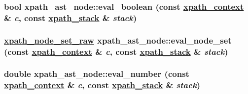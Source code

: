 \hypertarget{classxpath__ast__node_b7f965a92023bc2704b8e6fd9f3d7c14}{
\subsubsection[eval\_\-boolean]{\setlength{\rightskip}{0pt plus 5cm}bool xpath\_\-ast\_\-node::eval\_\-boolean (const \hyperlink{structxpath__context}{xpath\_\-context} \& {\em c}, const \hyperlink{structxpath__stack}{xpath\_\-stack} \& {\em stack})}}
\label{classxpath__ast__node_b7f965a92023bc2704b8e6fd9f3d7c14}


\hypertarget{classxpath__ast__node_30d98ec97e3129e82ac9ec3f2a759855}{
\subsubsection[eval\_\-node\_\-set]{\setlength{\rightskip}{0pt plus 5cm}\hyperlink{classxpath__node__set__raw}{xpath\_\-node\_\-set\_\-raw} xpath\_\-ast\_\-node::eval\_\-node\_\-set (const \hyperlink{structxpath__context}{xpath\_\-context} \& {\em c}, const \hyperlink{structxpath__stack}{xpath\_\-stack} \& {\em stack})}}
\label{classxpath__ast__node_30d98ec97e3129e82ac9ec3f2a759855}


\hypertarget{classxpath__ast__node_92dd7048e28d486bc7f382d1fc6f1de6}{
\subsubsection[eval\_\-number]{\setlength{\rightskip}{0pt plus 5cm}double xpath\_\-ast\_\-node::eval\_\-number (const \hyperlink{structxpath__context}{xpath\_\-context} \& {\em c}, const \hyperlink{structxpath__stack}{xpath\_\-stack} \& {\em stack})}}
\label{classxpath__ast__node_92dd7048e28d486bc7f382d1fc6f1de6}



